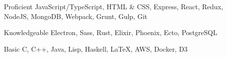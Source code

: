 

\begin{cvskills}

  \cvskill
    {Proficient} %
    {JavaScript/TypeScript, HTML \& CSS, Express, React, Redux, NodeJS, MongoDB, Webpack, Grunt, Gulp, Git} %

  \cvskill
    {Knowledgeable} %
    {Electron, Sass, Rust, Elixir, Phoenix, Ecto, PostgreSQL} %

  \cvskill
    {Basic} %
    {C, C++, Java, Lisp, Haskell, \LaTeX, AWS, Docker, D3} %

\end{cvskills}
